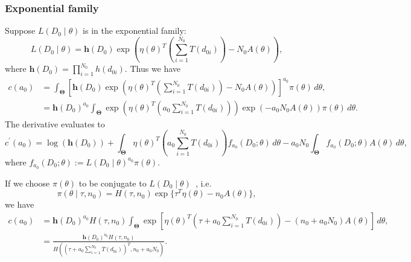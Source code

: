 \documentclass[a4paper, notitlepage, 11pt]{article}
\begin{document}
\subsubsection{Exponential family}
\label{sec:expo_family}

Suppose $L(D_0 \mid \theta)$ is in the exponential family:
\begin{equation}
 L(D_0 \mid \theta) = \boldsymbol h(D_0) \exp \left( \eta(\theta)^T \left(\sum_{i=1}^{N_0} T(d_{0i}) \right) - N_0 A(\theta) \right),
\end{equation}
where $\boldsymbol h(D_0) = \prod_{i = 1}^{N_0} h(d_{0i})$.
Thus we have
\begin{align}
 c(a_0) &=  \int_{\boldsymbol\Theta} \left[ \boldsymbol h(D_0) \exp \left( \eta(\theta)^T \left(\sum_{i=1}^{N_0} T(d_{0i}) \right) - N_0 A(\theta) \right) \right]^{a_0}\pi(\theta) \, d\theta, \\
  \label{eq:expo_family_const}
 &= \boldsymbol h(D_0)^{a_0}\int_{\boldsymbol\Theta} \exp \left( \eta(\theta)^T \left(a_0 \sum_{i=1}^{N_0} T(d_{0i}) \right) \right) \exp\left(- a_0N_0 A(\theta) \right) \pi(\theta) \, d\theta.
\end{align}
The derivative evaluates to 
\begin{equation}
\label{eq:expo_family_deriv_general}
 c^\prime(a_0) = \log(\boldsymbol h(D_0)) + \int_{\boldsymbol\Theta} \eta(\theta)^T \left(a_0 \sum_{i=1}^{N_0} T(d_{0i}) \right) f_{a_0}(D_0; \theta) \, d\theta -  a_0N_0\int_{\boldsymbol\Theta} f_{a_0}(D_0; \theta)  A(\theta) \, d\theta,
\end{equation}
where $f_{a_0}(D_0; \theta) := L(D_0 \mid \theta)^{a_0}\pi(\theta)$.

If we choose $\pi(\theta)$ to be conjugate to $L(D_0 \mid \theta)$~\citep{Diaconis1979}, i.e.
\begin{equation*}
 \label{eq:conj_exp_family}
 \pi(\theta \mid \tau, n_0) = H(\tau, n_0) \exp\{ \tau^T\eta(\theta) - n_0A(\theta) \},
\end{equation*}
we have 
\begin{align}
 \label{eq:expo_family_const_conj}
 c(a_0) &= \boldsymbol h(D_0)^{a_0} H(\tau, n_0) \int_{\boldsymbol\Theta}  \exp \left[ \eta(\theta)^T \left( \tau + a_0\sum_{i=1}^{N_0} T(d_{0i}) \right) -(n_0  + a_0N_0) A(\theta) \right] \, d\theta, \\
 &= \frac{\boldsymbol h(D_0)^{a_0} H(\tau, n_0)}{H\left( (\tau + a_0\sum_{i=1}^{N_0} T(d_{0i}))^T, n_0  + a_0N_0 \right)}.
\end{align}
\end{document}
